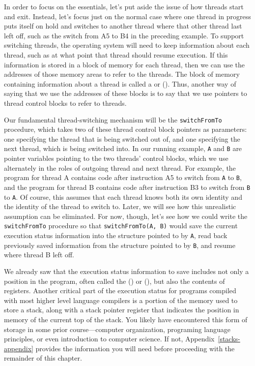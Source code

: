 In order to focus on the essentials, let's put aside the issue of how
threads start and exit.  Instead, let's focus just on the normal case where one
thread in progress puts itself on hold and switches to another thread
where that other thread last left off, such as the switch from A5 to
B4 in the preceding example.  To support switching threads,
the operating system will need to keep information about each thread,
such as at what point that thread should resume execution. If this
information is stored in a block of memory for each thread, then we
can use the addresses of those memory areas to refer to the threads.
The block of memory containing information about a thread is
called a  or
 ().  Thus, another way of
saying that we use the addresses of these blocks is to say that we use
pointers to thread control blocks to refer to threads.

Our fundamental thread-switching mechanism will be the
\verb|switchFromTo| procedure, which takes two of these
thread control block pointers as parameters: one specifying the
thread that is being switched out of, and one specifying the next
thread, which is being switched into.  In our running example,
\verb|A| and \verb|B| are pointer variables pointing to
the two threads' control blocks, which we use alternately in the
roles of outgoing thread and next thread.  For example, the program for
thread A contains code after instruction A5 to switch from
\verb|A| to \verb|B|, and the program for thread B
contains code after instruction B3 to switch from
\verb|B| to \verb|A|. Of course, this assumes that each
thread knows both its own identity and the identity of the thread to
switch to.  Later, we will see how this unrealistic assumption can be
eliminated.  For now, though, let's see how we could write the
\verb|switchFromTo| procedure so that
\verb|switchFromTo(A, B)| would save the current execution
status information into the structure pointed to by \verb|A|,
read back previously saved information from the structure pointed to
by \verb|B|, and resume where thread B left off.

We already saw that the execution status information to save includes
not only a position in the program, often called the 
() or  (), but also the contents of registers.
Another critical part of the execution status for programs compiled
with most higher level language compilers is a portion of the memory
used to store a stack, along with a stack pointer register that
indicates the position in memory of the current top of the stack.  You
likely have encountered this form of storage in some prior
course---computer organization, programing language principles, or
even introduction to computer science.  If not,
Appendix~\ref{stacks-appendix} provides the information you will need
before proceeding with the remainder of this chapter.

